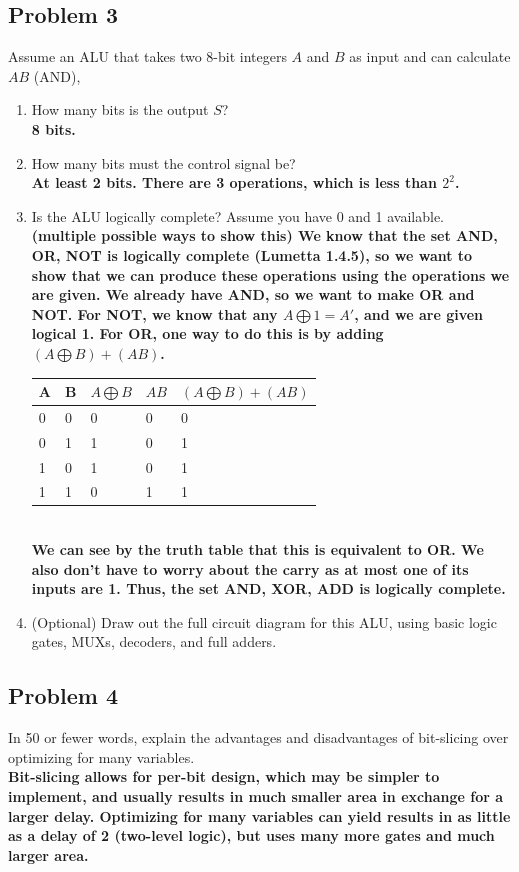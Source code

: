 \documentclass{article}
\begin{document}
\subsection*{Problem 3}
Assume an ALU that takes two 8-bit integers $A$ and $B$ as input and can calculate $AB$ (AND), 
\begin{enumerate}[label=\alph*.]
    \item How many bits is the output $S$? \\
    \textbf{8 bits.}
    \item How many bits must the control signal be? \\
    \textbf{At least 2 bits. There are 3 operations, which is less than $2^2$.}
    \item Is the ALU logically complete? Assume you have 0 and 1 available. \\
    \textbf{(multiple possible ways to show this)
We know that the set {AND, OR, NOT} is logically complete (Lumetta 1.4.5), so we want to show that we can produce these operations using the operations we are given.
We already have AND, so we want to make OR and NOT.
For NOT, we know that any $A\bigoplus1=A'$, and we are given logical 1.
For OR, one way to do this is by adding $(A\bigoplus B)+(AB)$.}
\begin{table}[!h]
\centering
\begin{tabular}{|l|l|l|l|l|}
\hline
A & B & $A\bigoplus B$ & $AB$ & $(A\bigoplus B)+(AB)$ \\ \hline
0 & 0 & 0  & 0  & 0         \\ \hline
0 & 1 & 1  & 0  & 1         \\ \hline
1 & 0 & 1  & 0  & 1         \\ \hline
1 & 1 & 0  & 1  & 1         \\ \hline
\end{tabular}
\end{table}\\
\textbf{
We can see by the truth table that this is equivalent to OR.
		We also don’t have to worry about the carry as at most one of its inputs are 1.
		Thus, the set {AND, XOR, ADD} is logically complete.
}

    \item (Optional) Draw out the full circuit diagram for this ALU, using basic logic gates, MUXs, decoders, and full adders.
\end{enumerate}


\subsection*{Problem 4}
In 50 or fewer words, explain the advantages and disadvantages of bit-slicing over optimizing for many variables.\\
\textbf{Bit-slicing allows for per-bit design, which may be simpler to implement, and usually results in much smaller area in exchange for a larger delay. 
Optimizing for many variables can yield results in as little as a delay of 2 (two-level logic), but uses many more gates and much larger area.}
\end{document}
